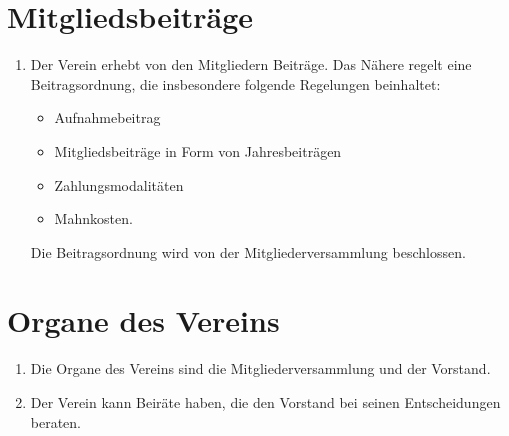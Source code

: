 \documentclass[12pt]{article}
\begin{document}
\section{Mitgliedsbeiträge}
\begin{enumerate}[label=(\arabic*)]
	\item Der Verein erhebt von den Mitgliedern Beiträge. Das Nähere regelt eine Beitragsordnung, die
	      insbesondere folgende Regelungen beinhaltet:
	      \begin{itemize}
		      \item Aufnahmebeitrag
		      \item Mitgliedsbeiträge in Form von Jahresbeiträgen
		      \item Zahlungsmodalitäten
		      \item Mahnkosten.
	      \end{itemize}
	      Die Beitragsordnung wird von der Mitgliederversammlung beschlossen.
\end{enumerate}

\section{Organe des Vereins}
\begin{enumerate}[label=(\arabic*)]
	\item Die Organe des Vereins sind die Mitgliederversammlung und der Vorstand.
	\item Der Verein kann Beiräte haben, die den Vorstand bei seinen Entscheidungen beraten.
\end{enumerate}
\end{document}
